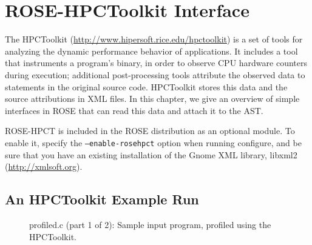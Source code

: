 \chapter{ROSE-HPCToolkit Interface}
\label{chap:rosehpct}

The HPCToolkit (\url{http://www.hipersoft.rice.edu/hpctoolkit}) is a
set of tools for analyzing the dynamic performance behavior of
applications. It includes a tool that instruments a program's binary,
in order to observe CPU hardware counters during execution; additional
post-processing tools attribute the observed data to statements in the
original source code. HPCToolkit stores this data and the source
attributions in XML files. In this chapter, we give an overview of
simple interfaces in ROSE that can read this data and attach it to the
AST.

ROSE-HPCT is included in the ROSE distribution as an optional
module. To enable it, specify the \texttt{--enable-rosehpct} option
when running configure, and be sure that you have an existing
installation of the Gnome XML library, libxml2
(\url{http://xmlsoft.org}).



\section{An HPCToolkit Example Run}
\label{chap:rosehpct:run}

\begin{figure}[!h]
{\indent
{\mySmallFontSize
\begin{latexonly}
   
\end{latexonly}

\begin{htmlonly}
   
\end{htmlonly}

}
}
\caption{profiled.c (part 1 of 2): Sample input program, profiled using the HPCToolkit.}
\label{Tutorial:roseHPCT:profiled:aa}
\end{figure}

